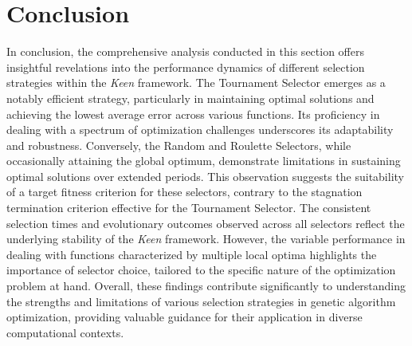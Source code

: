 \section{Conclusion}
\label{sec:fn_opt:conclusion}

    In conclusion, the comprehensive analysis conducted in this section offers insightful revelations into the 
    performance dynamics of different selection strategies within the \textit{Keen} framework. The Tournament Selector 
    emerges as a notably efficient strategy, particularly in maintaining optimal solutions and achieving the lowest 
    average error across various functions. Its proficiency in dealing with a spectrum of optimization challenges 
    underscores its adaptability and robustness. Conversely, the Random and Roulette Selectors, while occasionally 
    attaining the global optimum, demonstrate limitations in sustaining optimal solutions over extended periods. 
    This observation suggests the suitability of a target fitness criterion for these selectors, contrary to the 
    stagnation termination criterion effective for the Tournament Selector. The consistent selection times and 
    evolutionary outcomes observed across all selectors reflect the underlying stability of the \textit{Keen} framework. 
    However, the variable performance in dealing with functions characterized by multiple local optima highlights the 
    importance of selector choice, tailored to the specific nature of the optimization problem at hand. Overall, these 
    findings contribute significantly to understanding the strengths and limitations of various selection strategies 
    in genetic algorithm optimization, providing valuable guidance for their application in diverse computational 
    contexts.
